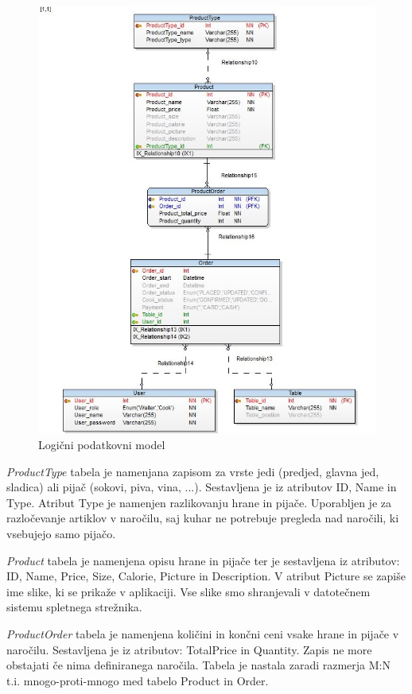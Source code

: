 \documentclass[a4paper, 12pt]{book}
\begin{document}
\begin{figure}[!htb]
\begin{center}
\includegraphics[width=12.5cm]{Database_physical}
\caption{Logični podatkovni model}
\label{Database_physical}
\end{center}
\end{figure}

\textit{ProductType} tabela je namenjana zapisom za vrste jedi (predjed, glavna jed, sladica) ali pijač (sokovi, piva, vina, ...). Sestavljena je iz atributov ID, Name in Type. Atribut Type je namenjen razlikovanju hrane in pijače. Uporabljen je za razločevanje artiklov v naročilu, saj kuhar ne potrebuje pregleda nad naročili, ki vsebujejo samo pijačo. 

\textit{Product} tabela je namenjena opisu hrane in pijače ter je sestavljena iz atributov: ID, Name, Price, Size, Calorie, Picture in Description.  V atribut Picture se zapiše ime slike, ki se prikaže v aplikaciji. Vse slike smo shranjevali v datotečnem sistemu spletnega strežnika.

\textit{ProductOrder} tabela je namenjena količini in končni ceni vsake hrane in pijače v naročilu. Sestavljena je iz atributov: TotalPrice in Quantity. Zapis ne more obstajati če nima definiranega naročila. Tabela je nastala zaradi razmerja M:N t.i. mnogo-proti-mnogo med tabelo Product in Order.
\end{document}
